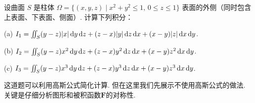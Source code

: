 \begin{example}[2023]
\label{ex:ch08-12}
设曲面 \( S \) 是柱体
    $\Omega = \{(x,y,z) \mid x^2 + y^2 \leq 1, \, 0 \leq z \leq 1\}$
    表面的外侧（同时包含上表面、下表面、侧面）.
    计算下列积分：

    (a) $I_1 = \iint_S (y - z) |x| \, \mathrm{d} y \, \mathrm{d} z + (z - x)|y| \, \mathrm{d} z \, \mathrm{d} x + (x - y)|z| \, \mathrm{d} x \, \mathrm{d} y$.

    (b) $I_2 = \iint_S (y - z)x^2 \, \mathrm{d} y \, \mathrm{d} z + (z - x)y^2 \, \mathrm{d} z \, \mathrm{d} x + (x - y)z^2 \, \mathrm{d} x \, \mathrm{d} y$.

    (c) $I_3 = \iint_S (y - z)x^3 \, \mathrm{d} y \, \mathrm{d} z + (z - x)y^3 \, \mathrm{d} z \, \mathrm{d} x + (x - y)z^3 \, \mathrm{d} x \, \mathrm{d} y$.
\end{example}

\begin{analysis}
这道题可以利用高斯公式简化计算.
    但在这里我们先展示不使用高斯公式的做法.
    关键是仔细分析图形和被积函数$\bm{F}$的对称性.
\end{analysis}

